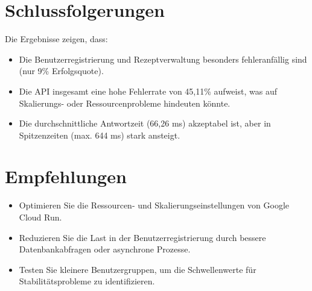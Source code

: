\newpage

\section*{Schlussfolgerungen}
Die Ergebnisse zeigen, dass:
\begin{itemize}
    \item Die Benutzerregistrierung und Rezeptverwaltung besonders fehleranfällig sind (nur 9\% 
        Erfolgsquote).
    \item Die API insgesamt eine hohe Fehlerrate von 45,11\% aufweist, was auf Skalierungs- oder 
        Ressourcenprobleme hindeuten könnte.
    \item Die durchschnittliche Antwortzeit (66,26 ms) akzeptabel ist, aber in Spitzenzeiten (max. 
        644 ms) stark ansteigt.
\end{itemize}

\section*{Empfehlungen}
\begin{itemize}
    \item Optimieren Sie die Ressourcen- und Skalierungseinstellungen von Google Cloud Run.
    \item Reduzieren Sie die Last in der Benutzerregistrierung durch bessere Datenbankabfragen 
        oder asynchrone Prozesse.
    \item Testen Sie kleinere Benutzergruppen, um die Schwellenwerte für Stabilitätsprobleme zu 
        identifizieren.
\end{itemize}
